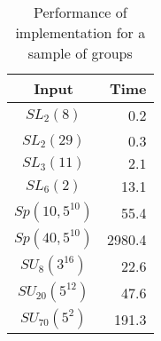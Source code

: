 \documentclass[12pt]{article}
\begin{document}
\begin{table}[h]
\caption{Performance of implementation for a sample of groups}
\label{table1}
\begin{center}
\begin{tabular}
{|c|r|} \hline
Input  &   Time  \rule{0cm}{2.5ex}\\
\hline
$SL_2(8)$  & 0.2 \rule{0cm}{2.5ex}\\ \hline
$SL_2(29)$ & 0.3 \rule{0cm}{2.5ex}\\ \hline
$SL_3(11)$ & $2.1$      \rule{0cm}{2.5ex}\\ \hline
$SL_6(2)$  & 13.1 \rule{0cm}{2.5ex}\\ \hline
$Sp(10,5^{10})$ & 55.4 \rule{0cm}{2.5ex}\\ \hline
$Sp(40,5^{10})$ & 2980.4 \rule{0cm}{2.5ex}\\ \hline
$SU_{8}(3^{16})$ & 22.6 \rule{0cm}{2.5ex}\\ \hline
$SU_{20}(5^{12})$ & 47.6 \rule{0cm}{2.5ex}\\ \hline
$SU_{70}(5^2)$ & 191.3 \rule{0cm}{2.5ex}\\ \hline
\end{tabular}
\end{center}
\end{table}
\end{document}
